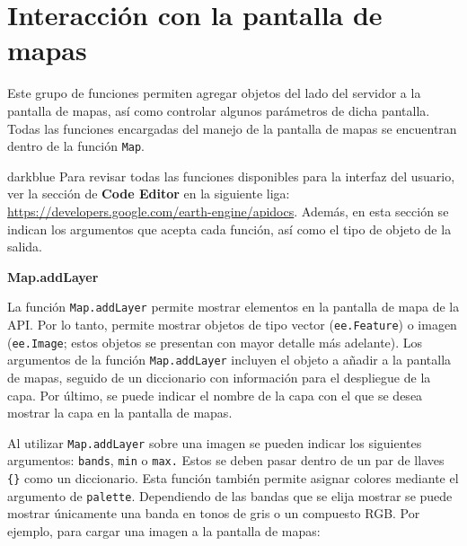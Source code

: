 \documentclass[
  12pt,
  letterpaper,
  twoside]{book}
\begin{document}
\hypertarget{interacciuxf3n-con-la-pantalla-de-mapas}{%
\section{Interacción con la pantalla de mapas}\label{interacciuxf3n-con-la-pantalla-de-mapas}}

Este grupo de funciones permiten agregar objetos del lado del servidor a la pantalla de mapas, así como controlar algunos parámetros de dicha pantalla. Todas las funciones encargadas del manejo de la pantalla de mapas se encuentran dentro de la función \texttt{Map}.

\begin{bluebox2}

\begin{awesomeblock}{5pt}{\faLightbulb}{darkblue}
Para revisar todas las funciones disponibles para la interfaz del usuario, ver la sección de \textbf{Code Editor} en la siguiente liga: \url{https://developers.google.com/earth-engine/apidocs}. Además, en esta sección se indican los argumentos que acepta cada función, así como el tipo de objeto de la salida.

\end{awesomeblock}

\end{bluebox2}

\textbf{Map.addLayer}

La función \texttt{Map.addLayer} permite mostrar elementos en la pantalla de mapa de la API. Por lo tanto, permite mostrar objetos de tipo vector (\texttt{ee.Feature}) o imagen (\texttt{ee.Image}; estos objetos se presentan con mayor detalle más adelante). Los argumentos de la función \texttt{Map.addLayer} incluyen el objeto a añadir a la pantalla de mapas, seguido de un diccionario con información para el despliegue de la capa. Por último, se puede indicar el nombre de la capa con el que se desea mostrar la capa en la pantalla de mapas.

Al utilizar \texttt{Map.addLayer} sobre una imagen se pueden indicar los siguientes argumentos: \texttt{bands}, \texttt{min} o \texttt{max.} Estos se deben pasar dentro de un par de llaves \texttt{\{\}} como un diccionario. Esta función también permite asignar colores mediante el argumento de \texttt{palette}. Dependiendo de las bandas que se elija mostrar se puede mostrar únicamente una banda en tonos de gris o un compuesto RGB. Por ejemplo, para cargar una imagen a la pantalla de mapas:
\end{document}
